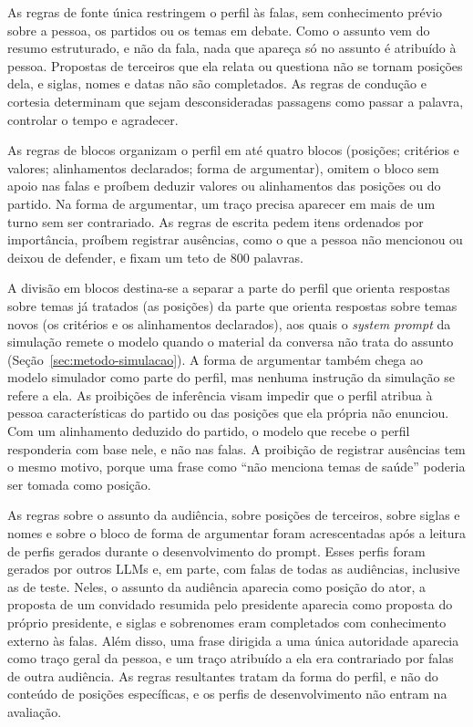 As regras de fonte única restringem o perfil às falas, sem conhecimento prévio sobre a pessoa, os
partidos ou os temas em debate. Como o assunto vem do resumo estruturado, e não da fala, nada que
apareça só no assunto é atribuído à pessoa. Propostas de terceiros que ela relata ou questiona não se
tornam posições dela, e siglas, nomes e datas não são completados. As regras de condução e cortesia
determinam que sejam desconsideradas passagens como passar a palavra, controlar o tempo e agradecer.

As regras de blocos organizam o perfil em até quatro blocos (posições; critérios e valores;
alinhamentos declarados; forma de argumentar), omitem o bloco sem apoio nas falas e proíbem deduzir
valores ou alinhamentos das posições ou do partido. Na forma de argumentar, um traço precisa aparecer
em mais de um turno sem ser contrariado. As regras de escrita pedem itens ordenados por importância,
proíbem registrar ausências, como o que a pessoa não mencionou ou deixou de defender, e fixam um teto
de 800 palavras.

A divisão em blocos destina-se a separar a parte do perfil que orienta respostas sobre temas já
tratados (as posições) da parte que orienta respostas sobre temas novos (os critérios e os
alinhamentos declarados), aos quais o \textit{system prompt} da simulação remete o modelo quando o
material da conversa não trata do assunto (Seção~\ref{sec:metodo-simulacao}). A forma de argumentar
também chega ao modelo simulador como parte do perfil, mas nenhuma instrução da simulação se refere a
ela. As proibições de inferência visam impedir que o perfil atribua à pessoa características do partido ou das posições
que ela própria não enunciou. Com um alinhamento deduzido do partido, o modelo que recebe o perfil
responderia com base nele, e não nas falas. A proibição de registrar ausências tem o mesmo motivo,
porque uma frase como ``não menciona temas de saúde'' poderia ser tomada como posição.

As regras sobre o assunto da audiência, sobre posições de terceiros, sobre siglas e nomes e sobre o
bloco de forma de argumentar foram acrescentadas após a leitura de perfis gerados durante o desenvolvimento do
prompt. Esses perfis foram gerados por outros LLMs e, em parte, com falas de todas as audiências,
inclusive as de teste. Neles, o assunto da audiência aparecia como posição do ator, a proposta de um
convidado resumida pelo presidente aparecia como proposta do próprio presidente, e siglas e sobrenomes
eram completados com conhecimento externo às falas. Além disso, uma frase dirigida a uma única
autoridade aparecia como traço geral da pessoa, e um traço atribuído a ela era contrariado por falas
de outra audiência. As regras resultantes tratam da forma do perfil, e não do conteúdo de posições
específicas, e os perfis de desenvolvimento não entram na avaliação.

